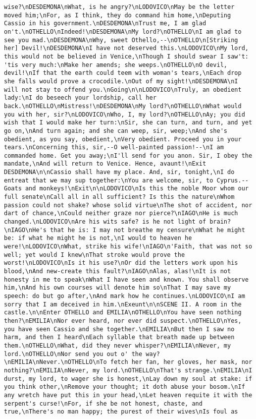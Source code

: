 \begin{verbatim}
wise?\nDESDEMONA\nWhat, is he angry?\nLODOVICO\nMay be the letter moved him;\nFor, as I think, they do command him home,\nDeputing Cassio in his government.\nDESDEMONA\nTrust me, I am glad on't.\nOTHELLO\nIndeed!\nDESDEMONA\nMy lord?\nOTHELLO\nI am glad to see you mad.\nDESDEMONA\nWhy, sweet Othello,--\nOTHELLO\n[Striking her] Devil!\nDESDEMONA\nI have not deserved this.\nLODOVICO\nMy lord, this would not be believed in Venice,\nThough I should swear I saw't: 'tis very much:\nMake her amends; she weeps.\nOTHELLO\nO devil, devil!\nIf that the earth could teem with woman's tears,\nEach drop she falls would prove a crocodile.\nOut of my sight!\nDESDEMONA\nI will not stay to offend you.\nGoing\n\nLODOVICO\nTruly, an obedient lady:\nI do beseech your lordship, call her back.\nOTHELLO\nMistress!\nDESDEMONA\nMy lord?\nOTHELLO\nWhat would you with her, sir?\nLODOVICO\nWho, I, my lord?\nOTHELLO\nAy; you did wish that I would make her turn:\nSir, she can turn, and turn, and yet go on,\nAnd turn again; and she can weep, sir, weep;\nAnd she's obedient, as you say, obedient,\nVery obedient. Proceed you in your tears.\nConcerning this, sir,--O well-painted passion!--\nI am commanded home. Get you away;\nI'll send for you anon. Sir, I obey the mandate,\nAnd will return to Venice. Hence, avaunt!\nExit DESDEMONA\n\nCassio shall have my place. And, sir, tonight,\nI do entreat that we may sup together:\nYou are welcome, sir, to Cyprus.--Goats and monkeys!\nExit\n\nLODOVICO\nIs this the noble Moor whom our full senate\nCall all in all sufficient? Is this the nature\nWhom passion could not shake? whose solid virtue\nThe shot of accident, nor dart of chance,\nCould neither graze nor pierce?\nIAGO\nHe is much changed.\nLODOVICO\nAre his wits safe? is he not light of brain?\nIAGO\nHe's that he is: I may not breathe my censure\nWhat he might be: if what he might he is not,\nI would to heaven he were!\nLODOVICO\nWhat, strike his wife!\nIAGO\n'Faith, that was not so well; yet would I knew\nThat stroke would prove the worst!\nLODOVICO\nIs it his use?\nOr did the letters work upon his blood,\nAnd new-create this fault?\nIAGO\nAlas, alas!\nIt is not honesty in me to speak\nWhat I have seen and known. You shall observe him,\nAnd his own courses will denote him so\nThat I may save my speech: do but go after,\nAnd mark how he continues.\nLODOVICO\nI am sorry that I am deceived in him.\nExeunt\n\nSCENE II. A room in the castle.\n\nEnter OTHELLO and EMILIA\nOTHELLO\nYou have seen nothing then?\nEMILIA\nNor ever heard, nor ever did suspect.\nOTHELLO\nYes, you have seen Cassio and she together.\nEMILIA\nBut then I saw no harm, and then I heard\nEach syllable that breath made up between them.\nOTHELLO\nWhat, did they never whisper?\nEMILIA\nNever, my lord.\nOTHELLO\nNor send you out o' the way?\nEMILIA\nNever.\nOTHELLO\nTo fetch her fan, her gloves, her mask, nor nothing?\nEMILIA\nNever, my lord.\nOTHELLO\nThat's strange.\nEMILIA\nI durst, my lord, to wager she is honest,\nLay down my soul at stake: if you think other,\nRemove your thought; it doth abuse your bosom.\nIf any wretch have put this in your head,\nLet heaven requite it with the serpent's curse!\nFor, if she be not honest, chaste, and true,\nThere's no man happy; the purest of their wives\nIs foul as 
\end{verbatim}

